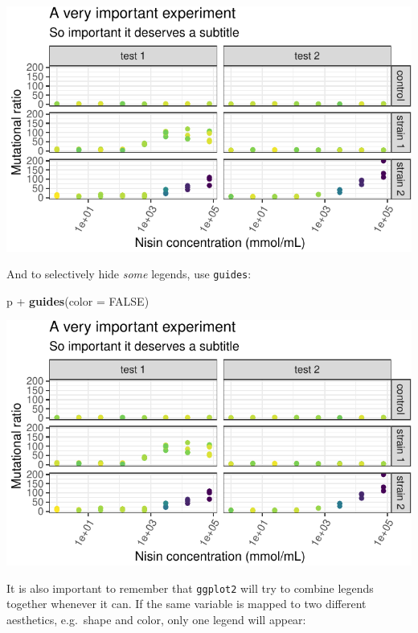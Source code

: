 \documentclass[]{book}
\newenvironment{Shaded}{}{}
\newcommand{\DataTypeTok}[1]{\textcolor[rgb]{0.56,0.13,0.00}{#1}}
\newcommand{\KeywordTok}[1]{\textcolor[rgb]{0.00,0.44,0.13}{\textbf{#1}}}
\newcommand{\NormalTok}[1]{#1}
\newcommand{\OperatorTok}[1]{\textcolor[rgb]{0.40,0.40,0.40}{#1}}
\newcommand{\OtherTok}[1]{\textcolor[rgb]{0.00,0.44,0.13}{#1}}
\newcommand{\StringTok}[1]{\textcolor[rgb]{0.25,0.44,0.63}{#1}}
\begin{document}
\begin{center}\includegraphics[width=\textwidth]{TRES-Tidy-Tutorial_files/figure-latex/unnamed-chunk-146-1} \end{center}

And to selectively hide \emph{some} legends, use \texttt{guides}:

\begin{Shaded}
\begin{Highlighting}[]
\NormalTok{p }\OperatorTok{+}\StringTok{ }\KeywordTok{guides}\NormalTok{(}\DataTypeTok{color =} \OtherTok{FALSE}\NormalTok{)}
\end{Highlighting}
\end{Shaded}

\begin{center}\includegraphics[width=\textwidth]{TRES-Tidy-Tutorial_files/figure-latex/unnamed-chunk-147-1} \end{center}

It is also important to remember that \texttt{ggplot2} will try to combine legends together whenever it can. If the same variable is mapped to two different aesthetics, e.g.~shape and color, only one legend will appear:
\end{document}
